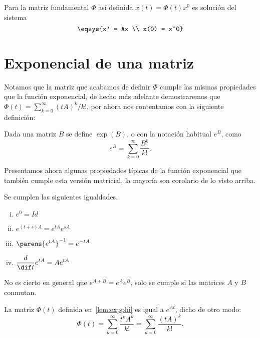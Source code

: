 \documentclass[../main.tex]{subfiles}
\begin{document}
Para la matriz fundamental \(\Phi\) así definida \(x(t) = \Phi(t)x^0\)
es solución del sistema
\[\eqsys{x' = Ax \\ x(0) = x^0}\]

\section{Exponencial de una matriz}

Notamos que la matriz que acabamos de definir \(\Phi\) cumple las
mismas propiedades que la función exponencial, de hecho más adelante
demostraremos que \(\Phi(t) = \sum_{k=0}^\infty (tA)^k/k!\), por ahora nos
contentamos con la siguiente definición:

\begin{definition}
	Dada una matriz \(B\) se define \(\exp(B)\), o con la notación habitual
	\(e^B\), como
	\[e^B = \sum_{k = 0}^\infty \frac{B^k}{k!}.\]
\end{definition}

Presentamos ahora algunas propiedades típicas de la función exponencial que
también cumple esta versión matricial, la mayoría son corolario de lo visto 
arriba.

\begin{proposition}
	Se cumplen las siguientes igualdades.
	\begin{multicols}{2}
	\begin{enumerate}[i)]
		\item \(\displaystyle e^0 = \mathit{Id}\) 
		\item \(\displaystyle e^{(t + s)A} = e^{tA} e^{sA}\) 
		\item \(\displaystyle \parens{e^{tA}}^{-1} = e^{-tA}\) 
		\item \(\displaystyle \frac{d}{\dif t} e^{tA} = A e^{tA}\)
	\end{enumerate}
	\end{multicols}
\end{proposition}

\begin{remark}
	No es cierto en general que \(e^{A + B} = e^A e^B\), solo se cumple si las
	matrices \(A\) y \(B\) conmutan.
\end{remark}

\begin{theorem}
	La matriz \(\Phi(t)\) definida en~\ref{lem:expphi} es igual a \(e^{At}\),
	dicho de otro modo:
	\[\Phi(t) = \sum_{k = 0}^\infty \frac{t^k A^k}{k!} = 
		\sum_{k = 0}^\infty \frac{(tA)^k}{k!}.\]
\end{theorem}
\end{document}
